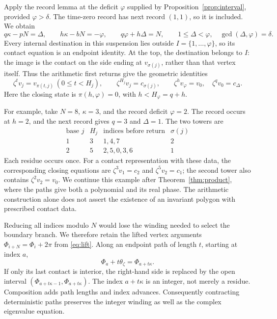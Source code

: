 \documentclass[11pt,a4paper]{article}
\theoremstyle{definition}
\theoremstyle{remark}
\numberwithin{equation}{section}
\begin{document}
Apply the record lemma at the deficit $\varphi$ supplied by Proposition~\ref{prop:interval}, provided $\varphi>\delta$. The time-zero record has next record $(1,1)$, so it is included. We obtain
\begin{equation}\label{eq:tower-data}
 q\kappa-pN=\Delta,\qquad h\kappa-bN=-\varphi,
 \qquad q\varphi+h\Delta=N,\qquad
 1\le\Delta<\varphi,\quad\gcd(\Delta,\varphi)=\delta.
\end{equation}
Every internal destination in this suspension lies outside
$I=\{1,\ldots,\varphi\}$, so its contact equation is an endpoint
identity. At the top, the destination belongs to $I$: the image is
the contact on the side ending at $v_{\sigma(j)}$, rather than that
vertex itself. Thus the arithmetic first returns give the geometric
identities
\begin{equation}\label{eq:towers}
 \zeta^t v_j=v_{\pi(t,j)}\ (0\le t<H_j),\qquad
 \zeta^{H_j}v_j=c_{\sigma(j)},\qquad
 \zeta^h v_\varphi=v_0,\quad \zeta^qv_0=c_\Delta.
\end{equation}
Here the closing state is $\pi(h,\varphi)=0$, with $h<H_\varphi=q+h$.

For example, take $N=8$, $\kappa=3$, and the record deficit
$\varphi=2$. The record occurs at $h=2$, and the next record gives
$q=3$ and $\Delta=1$. The two towers are
\[
\begin{array}{c|c|c|c}
\text{base }j&H_j&\text{indices before return}&\sigma(j)\\ \hline
1&3&1,4,7&2\\
2&5&2,5,0,3,6&1
\end{array}
\]
Each residue occurs once. For a contact representation with these
data, the corresponding closing equations are
$\zeta^3v_1=c_2$ and $\zeta^5v_2=c_1$; the second tower also contains
$\zeta^2v_2=v_0$. We continue this example after
Theorem~\ref{thm:product}, where the paths give both a polynomial and
its real phase. The arithmetic construction alone does not assert
the existence of an invariant polygon with prescribed contact data.

Reducing all indices modulo $N$ would lose the winding needed to
select the boundary branch. We therefore retain the lifted vertex
arguments $\Phi_{i+N}=\Phi_i+2\pi$ from \eqref{eq:lift}. Along an
endpoint path of length $t$, starting at index $a$,
\begin{equation}\label{eq:path-lift}
 \Phi_a+t\theta_\zeta=\Phi_{a+t\kappa}.
\end{equation}
If only its last contact is interior, the right-hand side is replaced by the open interval $(\Phi_{a+t\kappa-1},\Phi_{a+t\kappa})$. The index $a+t\kappa$ is an integer, not merely a residue. Composition adds path lengths and index advances. Consequently contracting deterministic paths preserves the integer winding as well as the complex eigenvalue equation.
\end{document}
